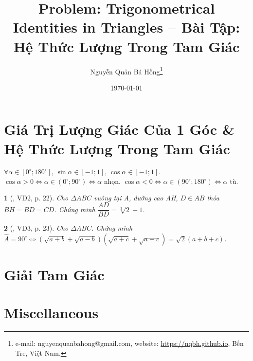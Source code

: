 \documentclass{article}
\title{Problem: Trigonometrical Identities in Triangles -- Bài Tập: Hệ Thức Lượng Trong Tam Giác}
\author{Nguyễn Quản Bá Hồng\footnote{e-mail: {\sf nguyenquanbahong@gmail.com}, website: \url{https://nqbh.github.io}, Bến Tre, Việt Nam.}}
\date{\today}
\newtheorem{baitoan}{}
\begin{document}
\maketitle
\tableofcontents


\section{Giá Trị Lượng Giác Của 1 Góc \& Hệ Thức Lượng Trong Tam Giác}
 $\forall\alpha\in[0^\circ;180^\circ]$, $\sin\alpha\in[-1;1]$, $\cos\alpha\in[-1;1]$.  $\cos\alpha > 0\Leftrightarrow\alpha\in(0^\circ;90^\circ)\Leftrightarrow\alpha$ nhọn. $\cos\alpha < 0\Leftrightarrow\alpha\in(90^\circ;180^\circ)\Leftrightarrow\alpha$ tù.

\begin{baitoan}[\cite{Hai_Hung_Thu_Tung2022_tap_1}, VD2, p. 22]
	Cho $\Delta ABC$ vuông tại A, đường cao AH, $D\in AB$ thỏa $BH = BD = CD$. Chứng minh $\dfrac{AD}{BD} = \sqrt[3]{2} - 1$.
\end{baitoan}

\begin{baitoan}[\cite{Hai_Hung_Thu_Tung2022_tap_1}, VD3, p. 23]
	Cho $\Delta ABC$. Chứng minh $\widehat{A} = 90^\circ\Leftrightarrow(\sqrt{a + b} + \sqrt{a - b})(\sqrt{a + c} + \sqrt{a - c}) = \sqrt{2}(a + b + c)$.
\end{baitoan}


\section{Giải Tam Giác}


\section{Miscellaneous}


\printbibliography[heading=bibintoc]
	
\end{document}
